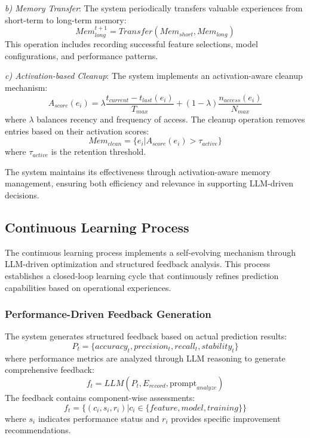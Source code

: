 \documentclass[conference]{IEEEtran}
\begin{document}
\textit{b) Memory Transfer}: The system periodically transfers valuable experiences from short-term to long-term memory:
\begin{equation}
    Mem_{long}^{t+1} = Transfer(Mem_{short}, Mem_{long})
\end{equation}
This operation includes recording successful feature selections, model configurations, and performance patterns.

\textit{c) Activation-based Cleanup}: The system implements an activation-aware cleanup mechanism:
\begin{equation}
    A_{score}(e_i) = \lambda\frac{t_{current} - t_{last}(e_i)}{T_{max}} + (1-\lambda)\frac{n_{access}(e_i)}{N_{max}}
\end{equation}
where $\lambda$ balances recency and frequency of access. The cleanup operation removes entries based on their activation scores:
\begin{equation}
    Mem_{clean} = \{e_i | A_{score}(e_i) > \tau_{active}\}
\end{equation}
where $\tau_{active}$ is the retention threshold.

The system maintains its effectiveness through activation-aware memory management, ensuring both efficiency and relevance in supporting LLM-driven decisions.
    
\subsection{Continuous Learning Process}
The continuous learning process implements a self-evolving mechanism through LLM-driven optimization and structured feedback analysis. This process establishes a closed-loop learning cycle that continuously refines prediction capabilities based on operational experiences.

\subsubsection{Performance-Driven Feedback Generation}
The system generates structured feedback based on actual prediction results:
\begin{equation}
    P_t = \{accuracy_t, precision_t, recall_t, stability_t\}
\end{equation}
where performance metrics are analyzed through LLM reasoning to generate comprehensive feedback:
\begin{equation}
    f_t = LLM(P_t, E_{record}, \text{prompt}_{analyze})
\end{equation}
The feedback contains component-wise assessments:
\begin{equation}
    f_t = \{(c_i, s_i, r_i) | c_i \in \{feature, model, training\}\}
\end{equation}
where $s_i$ indicates performance status and $r_i$ provides specific improvement recommendations.
\end{document}
